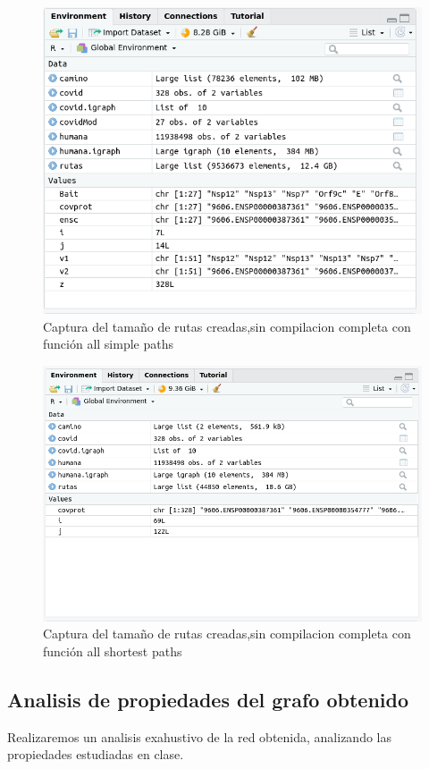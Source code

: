 \begin{figure}[ht!]
	\centering
	\includegraphics[scale = 0.3]{figures/allSimplePathTodos.png}
	\caption{Captura del tamaño de rutas creadas,sin compilacion completa con función all simple paths}
\end{figure}


\begin{figure}[ht!]
	\centering
	\includegraphics[scale = 0.3]{figures/allShortestPathTodos.png}
	\caption{Captura del tamaño de rutas creadas,sin compilacion completa con función all shortest paths}
\end{figure}



\subsection{Analisis de propiedades del grafo obtenido}
Realizaremos un analisis exahustivo de la red obtenida, analizando las propiedades estudiadas en clase.


